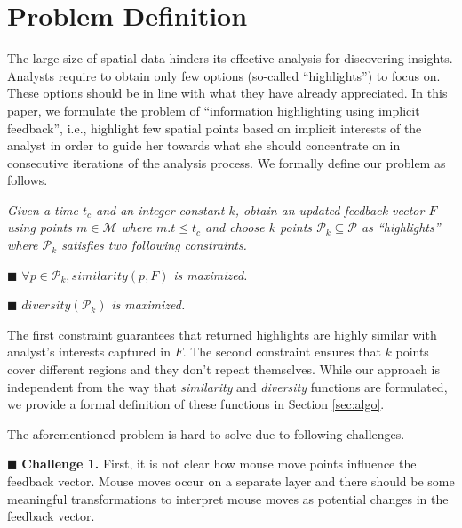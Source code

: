 \section{Problem Definition}
\label{sec:problem}
The large size of spatial data hinders its effective analysis for discovering insights. Analysts require to obtain only few options (so-called ``highlights'') to focus on. These options should be in line with what they have already appreciated. In this paper, we formulate the problem of ``information highlighting using implicit feedback'', i.e., highlight few spatial points based on implicit interests of the analyst in order to guide her towards what she should concentrate on in consecutive iterations of the analysis process. We formally define our problem as follows.

\vspace{3pt}
 {\em Given a time $t_c$ and an integer constant $k$, obtain an updated feedback vector $F$ using points $m \in \mathcal{M}$ where $m.t \leq t_c$ and choose $k$ points $\mathcal{P}_k \subseteq \mathcal{P}$ as ``highlights'' where $\mathcal{P}_k$ satisfies two following constraints.}

\vspace{2pt}
\noindent $\blacksquare$ $\forall p \in \mathcal{P}_k, \mathit{similarity}(p,F)$ {\em is maximized.}

\vspace{2pt}
\noindent $\blacksquare$ $\mathit{diversity}(\mathcal{P}_k)$ {\em is maximized.}

\vspace{3pt}
The first constraint guarantees that returned highlights are highly similar with analyst's interests captured in $F$. The second constraint ensures that $k$ points cover different regions and they don't repeat themselves. While our approach is independent from the way that {\em similarity} and {\em diversity} functions are formulated, we provide a formal definition of these functions in Section \ref{sec:algo}.

\vspace{2pt}
The aforementioned problem is hard to solve due to following challenges.

\vspace{3pt}
\noindent $\blacksquare$ {\bf Challenge 1.} First, it is not clear how mouse move points influence the feedback vector. Mouse moves occur on a separate layer and there should be some meaningful transformations to interpret mouse moves as potential changes in the feedback vector. 

